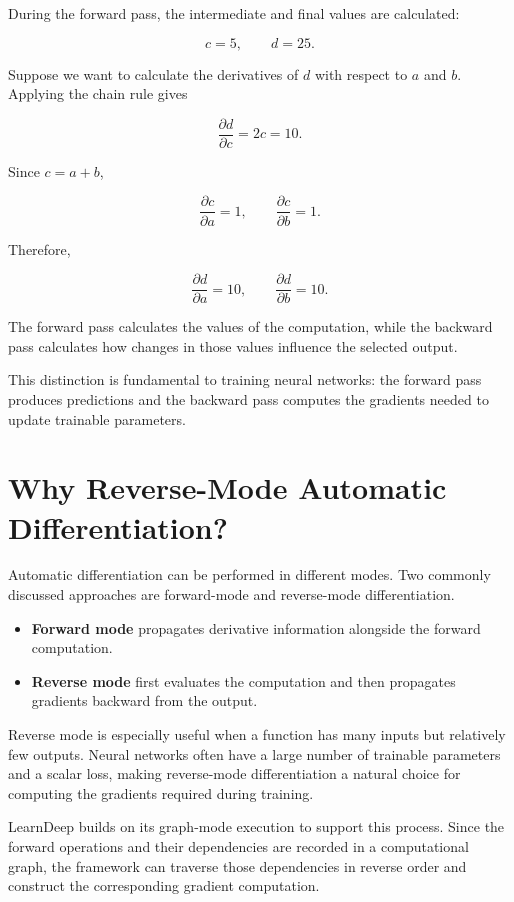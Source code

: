 During the forward pass, the intermediate and final values are calculated:

\[
c = 5,\qquad d = 25.
\]

Suppose we want to calculate the derivatives of \(d\) with respect to \(a\) and \(b\). Applying the chain rule gives

\[
\frac{\partial d}{\partial c} = 2c = 10.
\]

Since \(c=a+b\),

\[
\frac{\partial c}{\partial a}=1,
\qquad
\frac{\partial c}{\partial b}=1.
\]

Therefore,

\[
\frac{\partial d}{\partial a}=10,
\qquad
\frac{\partial d}{\partial b}=10.
\]

The forward pass calculates the values of the computation, while the backward pass calculates how changes in those values influence the selected output.

This distinction is fundamental to training neural networks: the forward pass produces predictions and the backward pass computes the gradients needed to update trainable parameters.

\section{Why Reverse-Mode Automatic Differentiation?}

Automatic differentiation can be performed in different modes. Two commonly discussed approaches are forward-mode and reverse-mode differentiation.

\begin{itemize}
    \item \textbf{Forward mode} propagates derivative information alongside the forward computation.
    \item \textbf{Reverse mode} first evaluates the computation and then propagates gradients backward from the output.
\end{itemize}

Reverse mode is especially useful when a function has many inputs but relatively few outputs. Neural networks often have a large number of trainable parameters and a scalar loss, making reverse-mode differentiation a natural choice for computing the gradients required during training.

LearnDeep builds on its graph-mode execution to support this process. Since the forward operations and their dependencies are recorded in a computational graph, the framework can traverse those dependencies in reverse order and construct the corresponding gradient computation.

